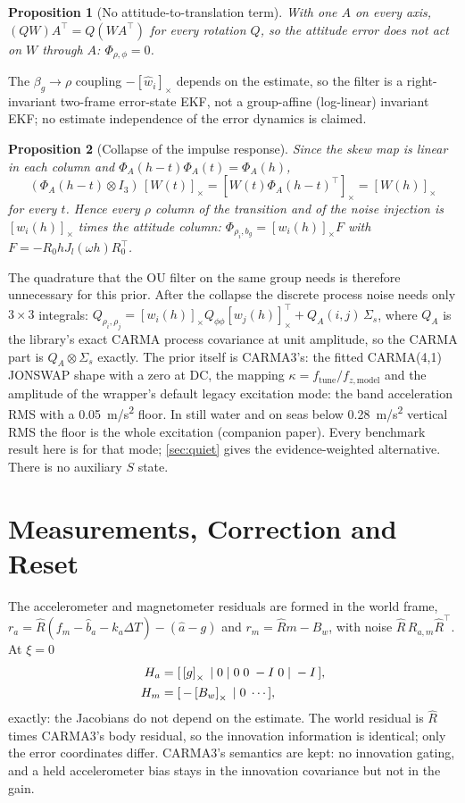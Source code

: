 \documentclass[conference]{IEEEtran}
\newcommand{\Skew}[1]{\left[#1\right]_\times}
\theoremstyle{bodysmall}
\newtheorem{proposition}{Proposition}
\begin{document}
\begin{proposition}[No attitude-to-translation term]
\label{prop:commute}
With one $A$ on every axis, $(QW)A^{\top}=Q(WA^{\top})$ for every rotation
$Q$, so the attitude error does not act on $W$ through $A$:
$\Phi_{\rho,\phi}=0$.
\end{proposition}

The $\beta_g\to\rho$ coupling $-\Skew{\hat w_i}$ depends on the estimate, so
the filter is a right-invariant two-frame error-state EKF, not a group-affine
(log-linear) invariant EKF; no estimate independence of the error dynamics is
claimed.

\begin{proposition}[Collapse of the impulse response]
\label{prop:collapse}
Since the skew map is linear in each column and
$\Phi_A(h-t)\Phi_A(t)=\Phi_A(h)$,
\begin{equation}
(\Phi_A(h-t)\otimes I_3)\,\Skew{W(t)}=\Skew{W(t)\Phi_A(h-t)^{\top}}
=\Skew{W(h)}
\end{equation}
for every $t$. Hence every $\rho$ column of the transition and of the noise
injection is $\Skew{w_i(h)}$ times the attitude column:
$\Phi_{\rho_i,b_g}=\Skew{w_i(h)}F$ with $F=-R_0hJ_l(\omega h)R_0^{\top}$.
\end{proposition}

The quadrature that the OU filter on the same group needs is therefore
unnecessary for this prior. After the collapse the discrete process noise
needs only $3\times3$ integrals: $Q_{\rho_i,\rho_j}=\Skew{w_i(h)}Q_{\phi\phi}
\Skew{w_j(h)}^{\top}+Q_A(i,j)\,\Sigma_s$, where $Q_A$ is the library's exact
CARMA process covariance at unit amplitude, so the CARMA part is
$Q_A\otimes\Sigma_s$ exactly. The prior itself is CARMA3's: the fitted
CARMA(4,1) JONSWAP shape with a zero at DC, the mapping $\kappa=f_{\mathrm{tune}}
/f_{z,\mathrm{model}}$ and the amplitude of the wrapper's default legacy
excitation mode: the band acceleration RMS with a \SI{0.05}{m/s^2} floor. In
still water and on seas below \SI{0.28}{m/s^2} vertical RMS the floor is the
whole excitation (companion paper). Every benchmark result here is for that
mode; \cref{sec:quiet} gives the evidence-weighted alternative.
There is no auxiliary $S$ state.

\section{Measurements, Correction and Reset}
\label{sec:measurement}
The accelerometer and magnetometer residuals are formed in the world frame,
$r_a=\hat R(f_m-\hat b_a-k_a\Delta T)-(\hat a-g)$ and $r_m=\hat Rm-B_w$, with
noise $\hat R\,R_{a,m}\hat R^{\top}$. At $\xi=0$
\begin{align}
H_a&=[\,\Skew{g}\;|\;0\;|\;0\;0\;-I\;0\;|\;-I\,],\notag\\
H_m&=[\,-\Skew{B_w}\;|\;0\;\cdots\,],
\end{align}
exactly: the Jacobians do not depend on the estimate. The world residual is
$\hat R$ times CARMA3's body residual, so the innovation information is
identical; only the error coordinates differ. CARMA3's semantics are kept: no
innovation gating, and a held accelerometer bias stays in the innovation
covariance but not in the gain.
\end{document}
